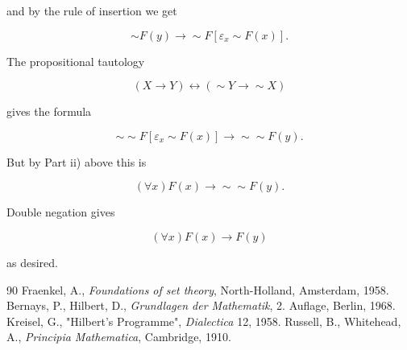 \documentclass[12pt]{article}
\begin{document}
\begin{enumerate}
\begin{itemize}
and by the rule of insertion we get

$$\sim F (y) \to \sim F [\varepsilon_{x} \sim F (x)].$$

The propositional tautology

$$(X \to Y) \leftrightarrow (\sim Y \to \sim X)$$ 

gives the formula

$$\sim \sim F [\varepsilon_{x} \sim F (x)] \to \sim \sim F (y).$$

But by Part ii) above this is
 
$$(\forall x) F (x) \to \sim \sim F (y).$$

Double negation gives

$$(\forall x) F (x) \to F (y)$$

as desired.
\end{itemize}
\end{enumerate} 

\begin{thebibliography} {90}
 Fraenkel, A., \emph{Foundations of set theory}, North-Holland, Amsterdam, 1958.
 Bernays, P., Hilbert, D., \emph{Grundlagen der Mathematik}, 2. Auflage, Berlin, 1968.
 Kreisel, G., "Hilbert's Programme", \emph{Dialectica} 12, 1958.
 Russell, B., Whitehead, A., \emph{Principia Mathematica}, Cambridge, 1910.
\end{thebibliography}
\end{document}
